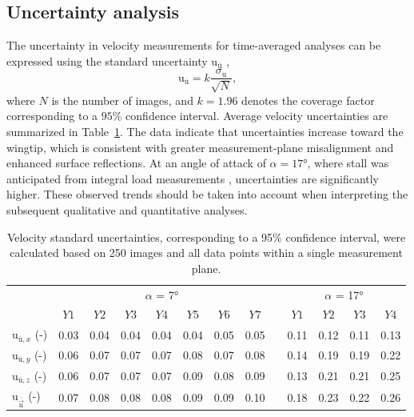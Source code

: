 \documentclass[wes, manuscript]{copernicus}
\begin{document}
\subsection{Uncertainty analysis}
%
The uncertainty in velocity measurements for time-averaged analyses can be expressed using the standard uncertainty $\textrm{u}_{\overline{\textrm{u}}}$ \citep{sciacchitano2016,huang2023,Bensason2025},
\begin{equation}
    \textrm{u}_{\overline{\textrm{u}}} = k \frac{\sigma_\textrm{u}}{\sqrt{N}} ,
\end{equation}
where $N$ is the number of images, and $k = 1.96$ denotes the coverage factor corresponding to a $95\%$ confidence interval. Average velocity uncertainties are summarized in Table~\ref{tab:uncertainty}. The data indicate that uncertainties increase toward the wingtip, which is consistent with greater measurement-plane misalignment and enhanced surface reflections. At an angle of attack of $\alpha = 17\unit{\degree}$, where stall was anticipated from integral load measurements \citep{Poland2025a}, uncertainties are significantly higher. These observed trends should be taken into account when interpreting the subsequent qualitative and quantitative analyses.
%
\begin{table}[h!]
    \centering
    \caption{Velocity standard uncertainties, corresponding to a 95\% confidence interval, were calculated based on 250 images and all data points within a single measurement plane.}
    \begin{tabular}{l ccccccc l cccc}
    \hline
    & \multicolumn{7}{c}{$\alpha$ = 7\unit{\degree}} & & \multicolumn{4}{c}{$\alpha$ = 17\unit{\degree}} \\
     & $Y1$ & $Y2$ & $Y3$ & $Y4$ & $Y5$ & $Y6$ & $Y7$ & & $Y1$ & $Y2$ & $Y3$ & $Y4$ \\
    \hline
    $\textrm{u}_{\overline{\textrm{u}},{x}}$ (\unit{-}) & 0.03 & 0.04 & 0.04 & 0.04 & 0.04 & 0.05 & 0.05 & & 0.11 & 0.12 & 0.11 & 0.13 \\
    $\textrm{u}_{\overline{\textrm{u}},{y}}$ (\unit{-})& 0.06 & 0.07 & 0.07 & 0.07 & 0.08 & 0.07 & 0.08 & & 0.14 & 0.19 & 0.19 & 0.22 \\
    $\textrm{u}_{\overline{\textrm{u}},{z}}$ (\unit{-})& 0.06 & 0.07 & 0.07 & 0.07 & 0.09 & 0.08 & 0.09 & & 0.13 & 0.21 & 0.21 & 0.25 \\
    $\textrm{u}_{\overline{\vec{u}}}$ (\unit{-})& 0.07 & 0.08 & 0.08 & 0.08 & 0.09 & 0.09 & 0.10 & & 0.18 & 0.23 & 0.22 & 0.26 \\
    \hline
    \end{tabular}
    \label{tab:uncertainty}
\end{table}
%
%
\end{document}
